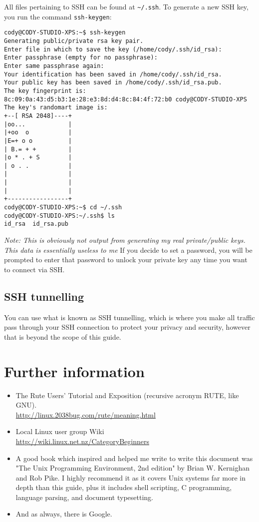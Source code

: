 \documentclass{article}
\begin{document}
All files pertaining to SSH can be found at \texttt{\textasciitilde/.ssh}. To generate a new SSH key, you run the command \texttt{ssh-keygen}:
\begin{verbatim}
cody@CODY-STUDIO-XPS:~$ ssh-keygen
Generating public/private rsa key pair.
Enter file in which to save the key (/home/cody/.ssh/id_rsa): 
Enter passphrase (empty for no passphrase): 
Enter same passphrase again: 
Your identification has been saved in /home/cody/.ssh/id_rsa.
Your public key has been saved in /home/cody/.ssh/id_rsa.pub.
The key fingerprint is:
8c:09:0a:43:d5:b3:1e:28:e3:8d:d4:8c:84:4f:72:b0 cody@CODY-STUDIO-XPS
The key's randomart image is:
+--[ RSA 2048]----+
|oo...            |
|+oo  o           |
|E=+ o o          |
| B.= + +         |
|o * . + S        |
| o . .           |
|                 |
|                 |
|                 |
+-----------------+
cody@CODY-STUDIO-XPS:~$ cd ~/.ssh
cody@CODY-STUDIO-XPS:~/.ssh$ ls
id_rsa  id_rsa.pub
\end{verbatim}
\emph{Note: This is obviously not output from generating my real private/public keys. This data is essentially useless to me}
If you decide to set a password, you will be prompted to enter that password to unlock your private key any time you want to connect via SSH.

\subsection{SSH tunnelling}
You can use what is known as SSH tunnelling, which is where you make all traffic pass through your SSH connection to protect your privacy and security, however that is beyond the scope of this guide. 

\section{Further information}
\begin{itemize}
\item The Rute Users' Tutorial and Exposition (recursive acronym RUTE, like GNU). \\ 
\url{http://linux.2038bug.com/rute/meaning.html}

\item Local Linux user group Wiki \\ \url{http://wiki.linux.net.nz/CategoryBeginners}

\item A good book which inspired and helped me write to write this document was "The Unix Programming Environment, 2nd edition" by Brian W. Kernighan and Rob Pike. I highly recommend it as it covers Unix systems far more in depth than this guide, plus it includes shell scripting, C programming, language parsing, and document typesetting. 

\item And as always, there is Google.
\end{itemize} 
\end{document}
